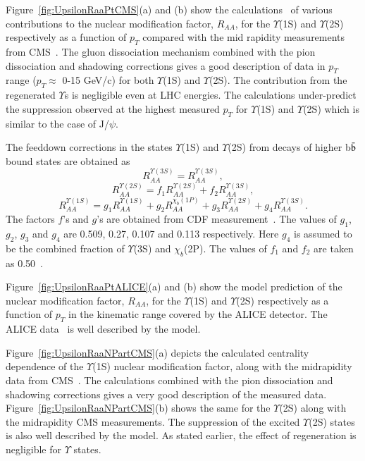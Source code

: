 {Figure~\ref{fig:UpsilonRaaPtCMS}(a) and (b) show the calculations~\cite{Kumar:2019xdj}
of various contributions to
the nuclear modification factor, $R_{AA}$, for the $\Upsilon$(1S) and $\Upsilon$(2S)
respectively as a function of $p_T$ compared with the mid rapidity measurements from
CMS~\cite{CMS:2018zza}.  
The gluon dissociation mechanism combined with the pion dissociation and shadowing
corrections gives a good description of data in $p_{T}$ range ($p_{T}\approx$ 0-15 GeV/c)
for both $\Upsilon$(1S) and $\Upsilon$(2S).
The contribution from the regenerated $\Upsilon$s is negligible even at LHC energies.
The calculations under-predict the suppression observed at the highest measured
$p_{T}$ for $\Upsilon$(1S) and $\Upsilon$(2S) which is similar to the case
of J/$\psi$.

The feeddown corrections in the states $\Upsilon$(1S) and $\Upsilon$(2S) 
from decays of higher b$\bar{\rm b}$ bound states are obtained as
  \begin{equation}
    R_{AA}^{\Upsilon(3S)} = R_{AA}^{\Upsilon(3S)}, %
  \end{equation}
  \begin{equation}
    R_{AA}^{\Upsilon(2S)} = f_1 R_{AA}^{\Upsilon(2S)} +  f_2 R_{AA}^{\Upsilon(3S)},  %
  \end{equation}
   \begin{equation}
    R_{AA}^{\Upsilon(1S)} = g_1 R_{AA}^{\Upsilon(1S)} +  g_2 R_{AA}^{\chi_b(1P)} + g_3 R_{AA}^{\Upsilon(2S)} + g_4 R_{AA}^{\Upsilon(3S)}. %
  \end{equation}
The factors $f$'s and $g$'s are obtained from CDF measurement~\cite{Affolder:1999wm}.
The values of $g_1$, $g_2$, $g_3$ and $g_4$ are 0.509, 0.27, 0.107
and 0.113 respectively. Here $g_4$ is assumed to be the combined fraction of 
$\Upsilon$(3S) and $\chi_b$(2P).
The values of $f_1$ and $f_2$ are taken as 0.50~\cite{Strickland:2011aa}.


Figure~\ref{fig:UpsilonRaaPtALICE}(a) and (b) show the model 
prediction \cite{Kumar:2019xdj} of the nuclear modification factor, $R_{AA}$, for the $\Upsilon$(1S)
and $\Upsilon$(2S) respectively as a function of $p_T$ in the kinematic range
covered by the ALICE detector. The ALICE data~\cite{ALICE:2020wwx} is well described by the model.

Figure~\ref{fig:UpsilonRaaNPartCMS}(a) depicts the calculated \cite{Kumar:2019xdj}
centrality dependence of the $\Upsilon$(1S) nuclear
modification factor, along with the midrapidity data from CMS~\cite{CMS:2018zza}.
The calculations combined with the pion dissociation and shadowing corrections 
gives a very good description of the measured data. Figure~\ref{fig:UpsilonRaaNPartCMS}(b)
shows the same for the $\Upsilon$(2S) along with the midrapidity
CMS measurements. The suppression of the excited $\Upsilon$(2S) states 
is also well described by the model. As stated earlier, the effect of regeneration is
negligible for $\Upsilon$ states. 

}
